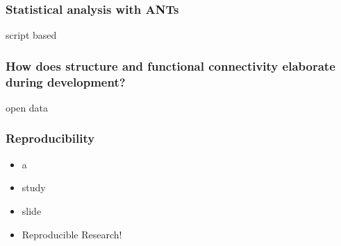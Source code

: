 \documentclass[18pt]{beamer}
\begin{document}
\begin{frame}
\frametitle{Statistical analysis with ANTs}
script based 
\end{frame}

\begin{frame}
\frametitle{How does structure and functional connectivity elaborate during development?}
open data
\end{frame}


\begin{frame}
\frametitle{Reproducibility}
\Huge
\begin{itemize}
\item a
\pause
\item study
\pause
\item slide
\pause
\item Reproducible Research!
\end{itemize}
\end{frame}
\end{document}
